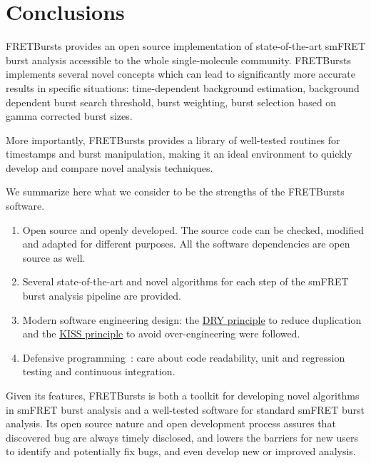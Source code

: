 \section{Conclusions}
\label{sec:conclusions}

FRETBursts provides an open source implementation of state-of-the-art smFRET burst analysis 
accessible to the whole single-molecule community.
FRETBursts implements several novel concepts which can lead 
to significantly more accurate results in specific situations:
time-dependent background estimation, background dependent burst search threshold,
burst weighting, burst selection based on gamma corrected burst sizes.

More importantly, FRETBursts provides a library of well-tested routines
for timestamps and burst manipulation, making it an ideal environment to 
quickly develop and compare novel analysis techniques.

We summarize here what we consider to be the strengths
of the FRETBursts software.

\begin{enumerate}
\item Open source and openly developed. The source code can be checked, modified and
adapted for different purposes. All the software dependencies are open source as well.
\item Several state-of-the-art and novel algorithms for each step of the
smFRET burst analysis pipeline are provided.
\item Modern software engineering design: the
\href{http://en.wikipedia.org/wiki/Don\%27t_repeat_yourself}{DRY principle}
to reduce duplication and the
\href{http://en.wikipedia.org/wiki/KISS_principle}{KISS principle}
to avoid over-engineering were followed.
\item Defensive programming~\cite{Prli__2012}: care about code readability,
unit and regression testing and continuous integration.
\end{enumerate}

Given its features, FRETBursts is both a toolkit for developing novel algorithms
in smFRET burst analysis and a well-tested software for standard smFRET burst analysis. 
Its open source nature and open development process assures that discovered bug 
are always timely disclosed, and lowers the barriers
for new users to identify and potentially fix bugs, and even develop new or improved analysis.


